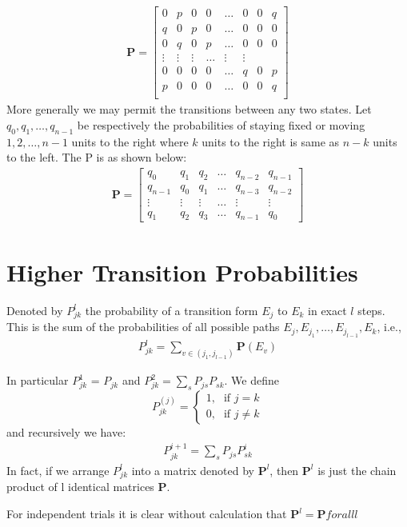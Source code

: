 \begin{example}

\begin{align}
 \mathbf{P} = \begin{bmatrix} 
    0 & p & 0 & 0 & \dots & 0 & 0 & q \\
    q & 0 & p & 0 & \dots & 0 & 0 & 0 \\
    0 & q & 0 & p & \dots & 0 & 0 & 0 \\
    \vdots & \vdots & \vdots & \dots & \vdots & \vdots\\
    0 & 0 & 0 & 0 & \dots & q & 0 & p \\
    p & 0 & 0 & 0 & \dots & 0 & 0 & q \\
    \end{bmatrix}   
\end{align}
More generally we may permit the transitions between any two states. Let $q_0, q_1, \dots, q_{n-1}$ be respectively the probabilities of staying fixed or moving $1, 2, \dots, n-1$ units to the right where $k$ units to the right is same as $n-k$ units to the left. The P is as shown below:
\begin{align}
    \mathbf{P} = \begin{bmatrix}
    q_0 & q_1 & q_2 & \dots & q_{n-2} & q_{n-1} \\
    q_{n-1} & q_0 & q_1 & \dots & q_{n-3} & q_{n-2} \\
    \vdots & \vdots & \vdots & \dots & \vdots & \vdots \\
    q_1 & q_2 & q_3 & \dots & q_{n-1} & q_0
    \end{bmatrix} 
\end{align}
\end{example}

\section{Higher Transition Probabilities}

Denoted by $P_{jk}^l$ the probability of a transition form $E_j$ to $E_k$ in exact $l$ steps. This is the sum of the probabilities of all possible paths $E_j, E_j_1, \dots, E_j_{l-1}, E_k$, i.e., 
\begin{align}
    P_{jk}^l = \sum_{v \in (j_1, j_{l-1})} \mathbf{P} {(E_v)}
\end{align}

In particular $P_{jk}^1$ = $P_{jk}$ and $P_{jk}^2 = \sum_s P_{js} P_{sk}$. 
We define \[P_{jk}^{(j)} = \begin{cases} \mbox{1,} & \mbox{if } j = k \\ \mbox{0,} & \mbox{if $j \neq k$} \end{cases} \]
and recursively we have:
\begin{align}
    P_{jk}^{i+1} = \sum_s P_{js}P_{sk}^i
\end{align}
In fact, if we arrange $P_{jk}^l$ into a matrix denoted by $\mathbf{P}^l$, then $\mathbf{P}^l$ is just the chain product of l identical matrices $\mathbf{P}$.
\begin{example}
For independent trials it is clear without calculation that $\mathbf{P}^l = \mathbf{P} for all l$
\end{example}